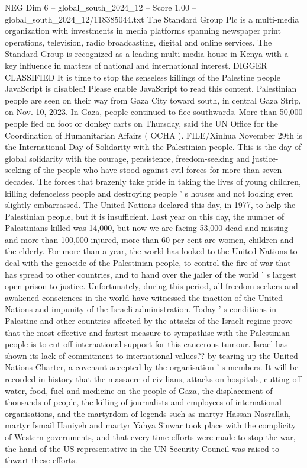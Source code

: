 \begin{textsample}{NEG Dim 6 – global\_south\_2024\_12 – Score 1.00 – global\_south\_2024\_12/118385044.txt}  \label{ex:f6_neg_123}
The Standard Group Plc is a multi-media organization with investments in media platforms spanning newspaper print operations, television, radio broadcasting, digital and online services.
The Standard Group is recognized as a leading multi-media house in Kenya with a key influence in matters of national and international interest.
DIGGER CLASSIFIED It is time to stop the senseless killings of the Palestine people JavaScript is disabled!
Please enable JavaScript to read this content.
Palestinian people are seen on their way from Gaza City toward south, in central Gaza Strip, on Nov. 10, 2023.
In Gaza, people continued to flee southwards.
More than 50,000 people fled on foot or donkey carts on Thursday, said the UN Office for the Coordination of Humanitarian Affairs ( OCHA ).
FILE/Xinhua November 29th is the International Day of Solidarity with the Palestinian people.
This is the day of global solidarity with the courage, persistence, freedom-seeking and justice-seeking of the people who have stood against evil forces for more than seven decades.
The forces that brazenly take pride in taking the lives of young children, killing defenceless people and destroying people ' s houses and not looking even slightly embarrassed.
The United Nations declared this day, in 1977, to help the Palestinian people, but it is insufficient.
Last year on this day, the number of Palestinians killed was 14,000, but now we are facing 53,000 dead and missing and more than 100,000 injured, more than 60 per cent are women, children and the elderly.
For more than a year, the world has looked to the United Nations to deal with the genocide of the Palestinian people, to control the fire of war that has spread to other countries, and to hand over the jailer of the world ' s largest open prison to justice.
Unfortunately, during this period, all freedom-seekers and awakened consciences in the world have witnessed the inaction of the United Nations and impunity of the Israeli administration.
Today ' s conditions in Palestine and other countries affected by the attacks of the Israeli regime prove that the most effective and fastest measure to sympathise with the Palestinian people is to cut off international support for this cancerous tumour.
Israel has shown its lack of commitment to international values?? by tearing up the United Nations Charter, a covenant accepted by the organisation ' s members.
It will be recorded in history that the massacre of civilians, attacks on hospitals, cutting off water, food, fuel and medicine on the people of Gaza, the displacement of thousands of people, the killing of journalists and employees of international organisations, and the martyrdom of legends such as martyr Hassan Nasrallah, martyr Ismail Haniyeh and martyr Yahya Sinwar took place with the complicity of Western governments, and that every time efforts were made to stop the war, the hand of the US representative in the UN Security Council was raised to thwart these efforts.

\end{textsample}
